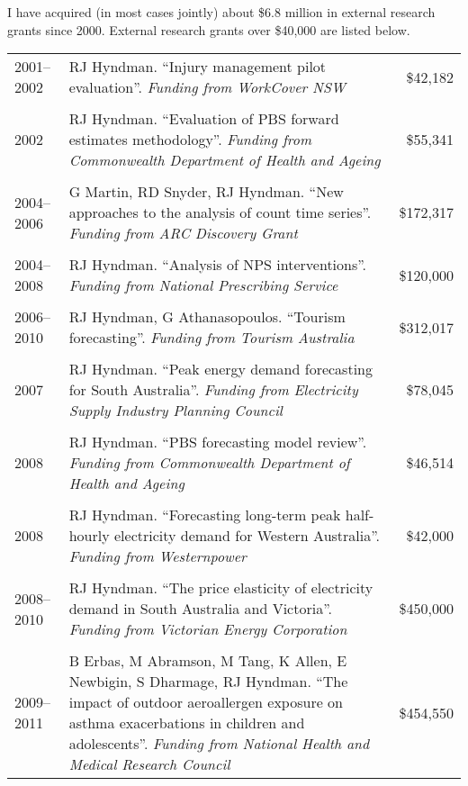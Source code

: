 \documentclass[10pt,a4paper,]{article}
\begin{document}
I have acquired (in most cases jointly) about \$6.8 million in external research grants since 2000. External research grants over \$40,000 are listed below.\vspace*{0.2cm}

\begingroup\fontsize{10}{16}
\begin{tabular}{lp{13.3cm}r}
   \hline
2001--2002 & RJ Hyndman. ``Injury management pilot evaluation''. \emph{Funding from WorkCover NSW} & \$42,182 \\ 
   \\[-0.2cm]2002 & RJ Hyndman. ``Evaluation of PBS forward estimates methodology''. \emph{Funding from Commonwealth Department of Health and Ageing} & \$55,341 \\ 
   \\[-0.2cm]2004--2006 & G Martin, RD Snyder, RJ Hyndman. ``New approaches to the analysis of count time series''. \emph{Funding from ARC Discovery Grant} & \$172,317 \\ 
   \\[-0.2cm]2004--2008 & RJ Hyndman. ``Analysis of NPS interventions''. \emph{Funding from National Prescribing Service} & \$120,000 \\ 
   \\[-0.2cm]2006--2010 & RJ Hyndman, G Athanasopoulos. ``Tourism forecasting''. \emph{Funding from Tourism Australia} & \$312,017 \\ 
   \\[-0.2cm]2007 & RJ Hyndman. ``Peak energy demand forecasting for South Australia''. \emph{Funding from Electricity Supply Industry Planning Council} & \$78,045 \\ 
   \\[-0.2cm]2008 & RJ Hyndman. ``PBS forecasting model review''. \emph{Funding from Commonwealth Department of Health and Ageing} & \$46,514 \\ 
   \\[-0.2cm]2008 & RJ Hyndman. ``Forecasting long-term peak half-hourly electricity demand for Western Australia''. \emph{Funding from Westernpower} & \$42,000 \\ 
   \\[-0.2cm]2008--2010 & RJ Hyndman. ``The price elasticity of electricity demand in South Australia and Victoria''. \emph{Funding from Victorian Energy Corporation} & \$450,000 \\ 
   \\[-0.2cm]2009--2011 & B Erbas, M Abramson, M Tang, K Allen, E Newbigin, S Dharmage, RJ Hyndman. ``The impact of outdoor aeroallergen exposure on asthma exacerbations in children and adolescents''. \emph{Funding from National Health and Medical Research Council} & \$454,550 \\ 

\end{tabular}
\end{document}
